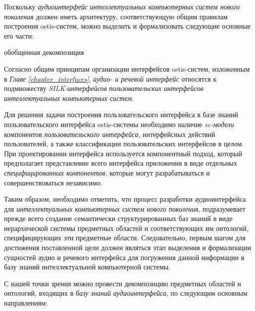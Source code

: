 Поскольку \textit{аудиоинтерфейс} \textit{интеллектуальных компьютерных систем нового поколения} должен иметь архитектуру, соответствующую общим правилам построения ostis-систем, можно выделить и формализовать следующие основные его части: 
\begin{SCn}
	\begin{scnrelfromset}{обобщенная декомпозиция}
	\end{scnrelfromset}
\end{SCn}

Согласно общим принципам организации интерфейсов ostis-систем, изложенным в \textit{Главе \ref{chapter_interfaces}}, \textit{аудио- и речевой интерфейс} относятся к подмножеству \textit{SILK-интерфейсов} \textit{пользовательских интерфейсов} \textit{интеллектуальных компьютерных систем}. 

Для решения задачи построения пользовательского интерфейса в базе знаний пользовательского интерфейса ostis-системы необходимо наличие \textit{sc-модели} компонентов \textit{пользовательского интерфейса}, интерфейсных действий пользователей, а также классификации пользовательских интерфейсов в целом. При проектировании интерфейса используется компонентный подход, который предполагает представление всего интерфейса приложения в виде отдельных \textit{специфицированных компонентов}, которые могут разрабатываться и совершенствоваться независимо.

Таким образом, необходимо отметить, что процесс разработки аудиоинтерфейса для \textit{интеллектуальных компьютерных систем нового поколения}, подразумевает прежде всего создание семантически структурированных баз знаний в виде иерархической системы предметных областей и соответствующих им онтологий, специфицирующих эти предметные области. Следовательно, первым шагом для достижения поставленной цели должен являться этап выделения и формализации сущностей аудио и речевого интерфейса для погружения данной информации в базу знаний интеллектуальной компьютерной системы.

С нашей точки зрения можно провести декомпозицию предметных областей и онтологий, входящих в \textit{базу знаний} \textit{аудиоинтерфейса}, по следующим основным направлениям:

